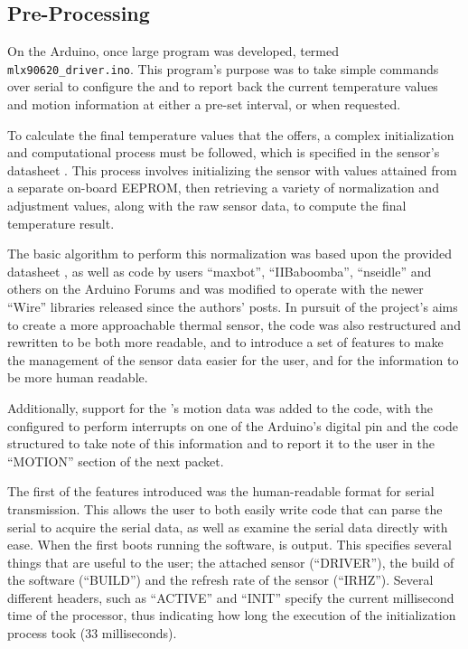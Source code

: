 \documentclass[../thesis/thesis.tex]{subfiles}
\begin{document}
\subsection{Pre-Processing}

On the Arduino, once large program was developed, termed \texttt{mlx90620\_driver.ino}. This program's purpose was to take simple commands over serial to configure the \mlx and to report back the current temperature values and \pir motion information at either a pre-set interval, or when requested.

To calculate the final temperature values that the \mlx offers, a complex initialization and computational process must be followed, which is specified in the sensor's datasheet \cite{MLXDatasheet}. This process involves initializing the sensor with values attained from a separate on-board \iic EEPROM, then retrieving a variety of normalization and adjustment values, along with the raw sensor data, to compute the final temperature result.

The basic algorithm to perform this normalization was based upon the provided datasheet \cite{MLXDatasheet}, as well as code by users ``maxbot'', ``IIBaboomba'', ``nseidle'' and others on the Arduino Forums \cite{ArduinoForum} and was modified to operate with the newer \ard ``Wire'' \iic libraries released since the authors' posts. In pursuit of the project's aims to create a more approachable thermal sensor, the code was also restructured and rewritten to be both more readable, and to introduce a set of features to make the management of the sensor data easier for the user, and for the information to be more human readable.

Additionally, support for the \pir's motion data was added to the code, with the \pir configured to perform interrupts on one of the Arduino's digital pin and the code structured to take note of this information and to report it to the user in the ``MOTION'' section of the next packet.

The first of the features introduced was the human-readable format for serial transmission. This allows the user to both easily write code that can parse the serial to acquire the serial data, as well as examine the serial data directly with ease. When the \ard first boots running the software,  is output. This specifies several things that are useful to the user; the attached sensor (``DRIVER''), the build of the software (``BUILD'') and the refresh rate of the sensor (``IRHZ''). Several different headers, such as ``ACTIVE'' and ``INIT'' specify the current millisecond time of the processor, thus indicating how long the execution of the initialization process took (33 milliseconds).
\end{document}
